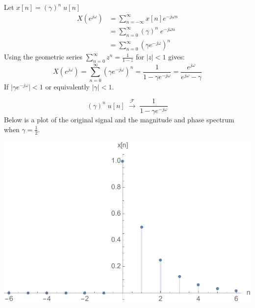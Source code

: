 \begin{example}

  Let $x[n] = \left( \gamma \right)^n\; u[n]$
  \begin{align*}
    X\left(e^{j\omega}\right) &= \sum\limits_{n = -\infty}^{\infty} x[n] e^{-j\omega n}\\
    &= \sum\limits_{n = 0}^{\infty} \left( \gamma \right)^n \; e^{-j\omega n}\\
    &= \sum\limits_{n = 0}^{\infty} \left( \gamma e^{-j\omega} \right)^n
  \end{align*}
  Using the geometric series $ \sum\limits_{n = 0}^{\infty} z^n = \frac{1}{1-z}$ for $|z| < 1$ gives:
  \[
  X\left(e^{j\omega}\right) = \sum\limits_{n = 0}^{\infty} \left( \gamma e^{-j\omega} \right)^n = \frac{1}{1-\gamma e^{-j\omega}} = \frac{e^{j\omega}}{e^{j\omega} - \gamma}
  \]
  If $\mid\gamma e^{-j\omega}\mid < 1$ or equivalently $\mid \gamma \mid < 1$.

  \[
  \left( \gamma \right)^n\; u[n] \; \stackrel{\mathcal{F}}{\longrightarrow} \; \frac{1}{1-\gamma e^{-j\omega}}
  \]
Below is a plot of the original signal and the magnitude and phase spectrum when $\gamma = \tfrac{1}{2}$.
  \begin{center}
    \includegraphics[scale=0.5]{graphics/dtft-example1-x.pdf}
  \end{center}


\end{example}
